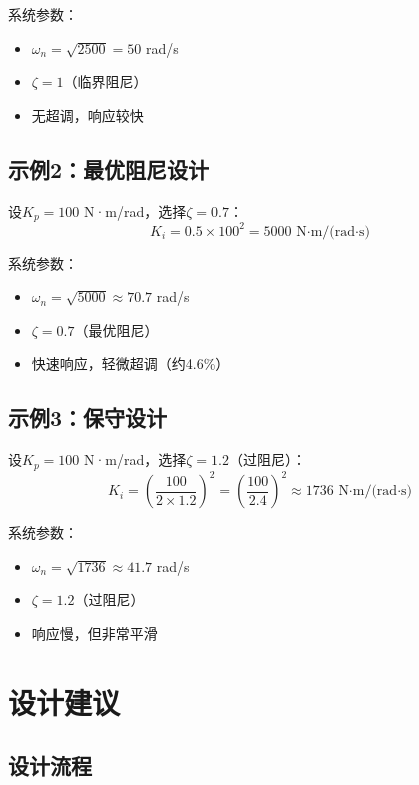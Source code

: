 \documentclass[12pt,a4paper]{article}
\begin{document}
系统参数：
\begin{itemize}
\item $\omega_n = \sqrt{2500} = 50$ rad/s
\item $\zeta = 1$（临界阻尼）
\item 无超调，响应较快
\end{itemize}

\subsection{示例2：最优阻尼设计}

设$K_p = 100$ N·m/rad，选择$\zeta = 0.7$：
\begin{equation}
K_i = 0.5 \times 100^2 = 5000 \text{ N·m/(rad·s)}
\end{equation}

系统参数：
\begin{itemize}
\item $\omega_n = \sqrt{5000} \approx 70.7$ rad/s
\item $\zeta = 0.7$（最优阻尼）
\item 快速响应，轻微超调（约4.6\%）
\end{itemize}

\subsection{示例3：保守设计}

设$K_p = 100$ N·m/rad，选择$\zeta = 1.2$（过阻尼）：
\begin{equation}
K_i = \left(\frac{100}{2 \times 1.2}\right)^2 = \left(\frac{100}{2.4}\right)^2 \approx 1736 \text{ N·m/(rad·s)}
\end{equation}

系统参数：
\begin{itemize}
\item $\omega_n = \sqrt{1736} \approx 41.7$ rad/s
\item $\zeta = 1.2$（过阻尼）
\item 响应慢，但非常平滑
\end{itemize}

\section{设计建议}

\subsection{设计流程}
\end{document}
